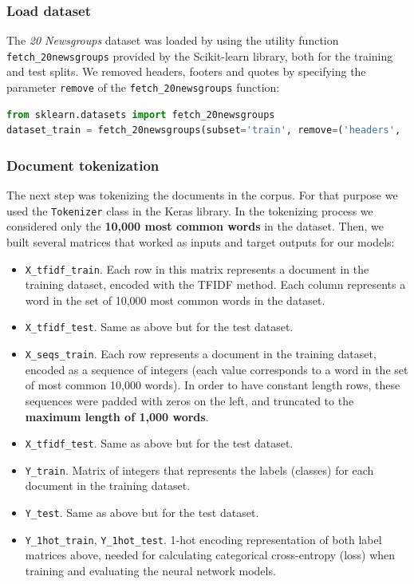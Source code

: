 \documentclass[10pt,journal,compsoc, onecolumn]{IEEEtran}
\begin{document}
\subsubsection{Load dataset}
The \textit{20 Newsgroups} dataset was loaded by using the utility function \verb|fetch_20newsgroups| provided by the Scikit-learn library, both for the training and test splits. We removed headers, footers and quotes by specifying the parameter \verb|remove| of the \verb|fetch_20newsgroups| function:

\begin{lstlisting}[language=Python]
from sklearn.datasets import fetch_20newsgroups
dataset_train = fetch_20newsgroups(subset='train', remove=('headers', 'footers', 'quotes'))
\end{lstlisting}

\subsubsection{Document tokenization}\label{sec:tokenization}
The next step was tokenizing the documents in the corpus. For that purpose we used the \verb|Tokenizer| class in the Keras library. In the tokenizing process we considered only the \textbf{10,000 most common words} in the dataset. Then, we built several matrices that worked as inputs and target outputs for our models:

\begin{itemize}
    \item \verb|X_tfidf_train|. Each row in this matrix represents a document in the training dataset, encoded with the TFIDF method. Each column represents a word in the set of 10,000 most common words in the dataset.
    \item \verb|X_tfidf_test|. Same as above but for the test dataset.
    \item \verb|X_seqs_train|. Each row represents a document in the training dataset, encoded as a sequence of integers (each value corresponds to a word in the set of most common 10,000 words). In order to have constant length rows, these sequences were padded with zeros on the left, and truncated to the \textbf{maximum length of 1,000 words}.
    \item \verb|X_tfidf_test|. Same as above but for the test dataset.
    \item \verb|Y_train|. Matrix of integers that represents the labels (classes) for each document in the training dataset.
    \item \verb|Y_test|. Same as above but for the test dataset.
    \item \verb|Y_1hot_train|, \verb|Y_1hot_test|. 1-hot encoding representation of both label matrices above, needed for calculating categorical cross-entropy (loss) when training and evaluating the neural network models.
\end{itemize}
\end{document}
